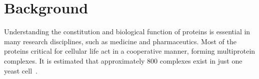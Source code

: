 \documentclass[twocolumn]{bmcart}%
\begin{document}
\begin{frontmatter}
\begin{fmbox}
\begin{abstractbox}

\begin{keyword}
\end{keyword}


\end{abstractbox}
%
\end{fmbox}%

\end{frontmatter}



\section*{Background}
Understanding the constitution and biological function of proteins is essential in many research disciplines, such as medicine and pharmaceutics.
Most of the proteins critical for cellular life act in a cooperative manner, forming multiprotein complexes. 
It is estimated that approximately 800 complexes exist in just one yeast cell~\cite{Gavin}. 
\end{document}
